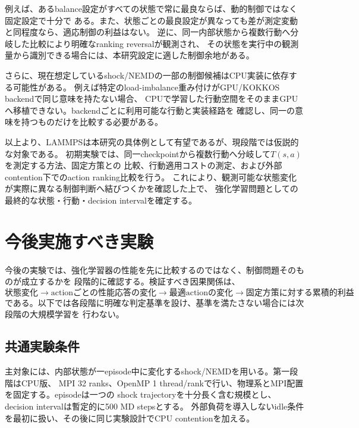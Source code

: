 例えば、あるbalance設定がすべての状態で常に最良ならば、動的制御ではなく固定設定で十分で
ある。また、状態ごとの最良設定が異なっても差が測定変動と同程度なら、適応制御の利益はない。
逆に、同一内部状態から複数行動へ分岐した比較により明確なranking reversalが観測され、
その状態を実行中の観測量から識別できる場合には、本研究設定に適した制御余地がある。

さらに、現在想定しているshock/NEMDの一部の制御候補はCPU実装に依存する可能性がある。
例えば特定のload-imbalance重み付けがGPU/KOKKOS backendで同じ意味を持たない場合、
CPUで学習した行動空間をそのままGPUへ移植できない。backendごとに利用可能な行動と実装経路を
確認し、同一の意味を持つものだけを比較する必要がある。

以上より、LAMMPSは本研究の具体例として有望であるが、現段階では仮説的な対象である。
初期実験では、同一checkpointから複数行動へ分岐して$T(s,a)$を測定する方法、固定方策との
比較、行動適用コストの測定、および外部contention下でのaction ranking比較を行う。
これにより、観測可能な状態変化が実際に異なる制御判断へ結びつくかを確認した上で、
強化学習問題としての最終的な状態・行動・decision intervalを確定する。

\section{今後実施すべき実験}
\label{sec:lammps-next-experiments}

今後の実験では、強化学習器の性能を先に比較するのではなく、制御問題そのものが成立するかを
段階的に確認する。検証すべき因果関係は、
\begin{equation}
 \text{状態変化}
 \rightarrow \text{actionごとの性能応答の変化}
 \rightarrow \text{最適actionの変化}
 \rightarrow \text{固定方策に対する累積的利益}
\end{equation}
である。以下では各段階に明確な判定基準を設け、基準を満たさない場合には次段階の大規模学習を
行わない。

\subsection{共通実験条件}

主対象には、内部状態が一episode中に変化するshock/NEMDを用いる。第一段階はCPU版、
MPI 32 ranks、OpenMP 1 thread/rankで行い、物理系とMPI配置を固定する。episodeは一つの
shock trajectoryを十分長く含む規模とし、decision intervalは暫定的に500 MD stepsとする。
外部負荷を導入しないidle条件を最初に扱い、その後に同じ実験設計でCPU contentionを加える。

